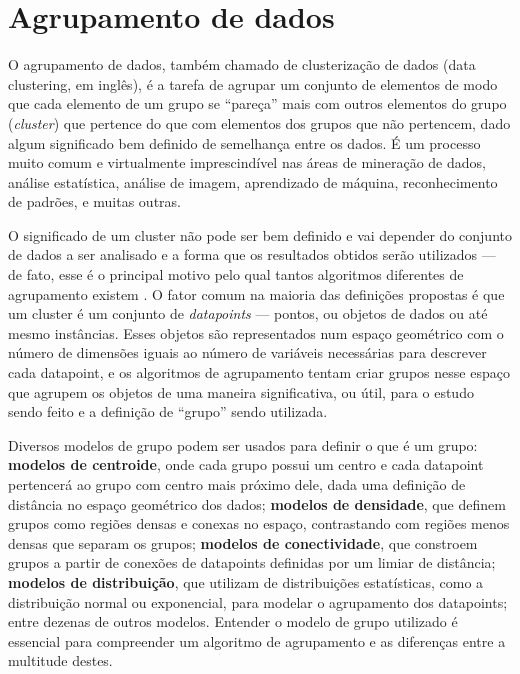 \documentclass[12pt,
openright, 
oneside, %
a4paper,    %
brazil]{facom-ufu-abntex2}
\begin{document}




\section{Agrupamento de dados}

O agrupamento de dados, também chamado de clusterização de dados (data clustering, em inglês), é a tarefa de agrupar um conjunto de elementos de modo que cada elemento de um grupo se \enquote{pareça} mais com outros elementos do grupo (\textit{cluster}) que pertence do que com elementos dos grupos que não pertencem, dado algum significado bem definido de semelhança entre os dados. É um processo muito comum e virtualmente imprescindível nas áreas de mineração de dados, análise estatística, análise de imagem, aprendizado de máquina, reconhecimento de padrões, e muitas outras.

O significado de um cluster não pode ser bem definido e vai depender do conjunto de dados a ser analisado e a forma que os resultados obtidos serão utilizados --- de fato, esse é o principal motivo pelo qual tantos algoritmos diferentes de agrupamento existem \cite{SoManyClustAlg}. O fator comum na maioria das definições propostas é que um cluster é um conjunto de \textit{datapoints} --- pontos, ou objetos de dados ou até mesmo instâncias. Esses objetos são representados num espaço geométrico com o número de dimensões iguais ao número de variáveis necessárias para descrever cada datapoint, e os algoritmos de agrupamento tentam criar grupos nesse espaço que agrupem os objetos de uma maneira significativa, ou útil, para o estudo sendo feito e a definição de \enquote{grupo} sendo utilizada.



Diversos modelos de grupo podem ser usados para definir o que é um grupo: \textbf{modelos de centroide}, onde cada grupo possui um centro e cada datapoint pertencerá ao grupo com centro mais próximo dele, dada uma definição de distância no espaço geométrico dos dados; \textbf{modelos de densidade}, que definem grupos como regiões densas e conexas no espaço, contrastando com regiões menos densas que separam os grupos; \textbf{modelos de conectividade}, que constroem grupos a partir de conexões de datapoints definidas por um limiar de distância; \textbf{modelos de distribuição}, que utilizam de distribuições estatísticas, como a distribuição normal ou exponencial, para modelar o agrupamento dos datapoints; entre dezenas de outros modelos. Entender o modelo de grupo utilizado é essencial para compreender um algoritmo de agrupamento e as diferenças entre a multitude destes.
\end{document}
